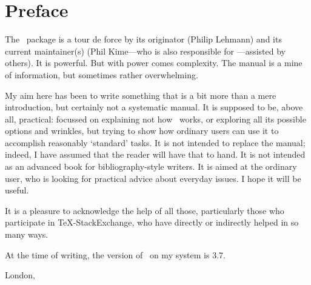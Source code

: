 
\maketitle

\tableofcontents

\chapter{Preface}

The \biblatex\ package is a tour de force by its originator (Philip
Lehmann) and its current maintainer(s) (Phil Kime---who is also
responsible for ---assisted by others). It is
powerful. But with power comes complexity. The manual is a mine of
information, but sometimes rather overwhelming.

My aim here has been to write something that is a bit more than a mere
introduction, but certainly not a systematic manual. It is supposed to
be, above all, practical: focussed on explaining not how \biblatex\
works, or exploring all its possible options and wrinkles, but trying
to show how ordinary users can use it to accomplish reasonably
`standard' tasks. It is not intended to replace the manual; indeed, I
have assumed that the reader will have that to hand. It is not
intended as an advanced book for bibliography-style writers. It is
aimed at the ordinary user, who is looking for practical advice about
everyday issues. I hope it will be useful.

It is a pleasure to acknowledge the help of all those, particularly
those who participate in \TeX-StackExchange, who have directly or
indirectly helped in so many ways.

At the time of writing, the version of \biblatex\ on my system is 3.7.

\hfill{}

\hfill{London, \prefacedate}

